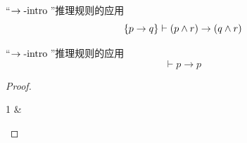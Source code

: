 \begin{frame}{}
  \begin{exampleblock}{``$\to\text{-intro}\;$''推理规则的应用}
    \[
      \{p \to q\} \vdash (p \land r) \to (q \land r)
    \]
  \end{exampleblock}

\end{frame}

\begin{frame}{}
  \begin{exampleblock}{``$\to\text{-intro}\;$''推理规则的应用}
    \[
      \vdash p \to p
    \]
  \end{exampleblock}

	\vspace{0.50cm}
	\begin{proof}
		\begin{logicproof}{1}
       & 
		\end{logicproof}
	\end{proof}
\end{frame}

